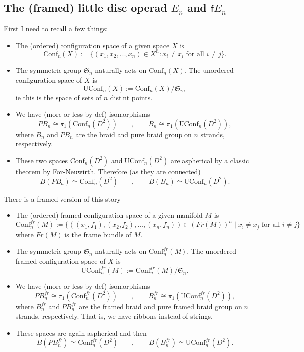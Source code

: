 \documentclass[11pt]{article}
\theoremstyle{definition}
\begin{document}
\subsection{The (framed) little disc operad $E_n$ and $\mathsf{f}E_n$} 




First I need to recall a few things:
\begin{itemize}
    \item The (ordered) configuration space of a given space $X$ is $$\text{Conf}_n(X) := \{ (x_1, x_2, \ldots, x_n) \in X^n : x_i \neq x_j \text{ for all } i \neq j \}.$$
    \item The symmetric group $\mathfrak{S}_n$ naturally acts on $\text{Conf}_n(X)$. The unordered configuration space of $X $ is 
    $$ \text{UConf}_n(X) := \text{Conf}_n(X)/\mathfrak{S}_n ,$$ ie this is the space of sets of $n$ distint points.
    \item We have (more or less by def) isomorphisms
    $$ PB_n \cong \pi_1 (\text{Conf}_n(D^2))  \qquad , \qquad   B_n \cong \pi_1 (\text{UConf}_n(D^2)) ,$$
    where $B_n$ and $PB_n$ are the braid and pure braid group on $n$ strands, respectively.
    \item  These two spaces $\text{Conf}_n(D^2)$ and $\text{UConf}_n(D^2)$ are aspherical by a classic theorem by Fox-Neuwirth. Therefore (as they are connected) $$  B( PB_n) \simeq \text{Conf}_n(D^2)  \qquad , \qquad   B(B_n) \simeq \text{UConf}_n(D^2).  $$

\end{itemize}

There is a framed version of this story

\begin{itemize}
    \item The (ordered) framed configuration space of a given manifold $M$ is $$ \text{Conf}_n^{fr}(M):=  \{ ((x_1, f_1), (x_2, f_2), \ldots, (x_n, f_n)) \in (Fr(M))^n \mid x_i \neq x_j \text{ for all } i \neq j \}$$
    where $Fr(M)$ is the frame bundle of $M$.
    \item The symmetric group $\mathfrak{S}_n$ naturally acts on $\text{Conf}_n^{fr}(M)$. The unordered framed configuration space of $X $ is 
    $$ \text{UConf}_n^{fr}(M) := \text{Conf}_n^{fr}(M)/\mathfrak{S}_n .$$
    \item  We have (more or less by def) isomorphisms
    $$ PB_n^{fr} \cong \pi_1 (\text{Conf}_n^{fr}(D^2))  \qquad , \qquad   B_n^{fr} \cong \pi_1 (\text{UConf}^{fr}_n(D^2)) ,$$
    where $B_n^{fr}$ and $PB_n^{fr}$ are the framed braid and pure framed braid group on $n$ strands, respectively. That is, we have ribbons instead of strings.
    \item These spaces are again aspherical and then 
    $$  B( PB_n^{fr}) \simeq \text{Conf}^{fr}_n(D^2)  \qquad , \qquad   B(B_n^{fr}) \simeq \text{UConf}^{fr}_n(D^2).  $$
\end{itemize}
\end{document}

